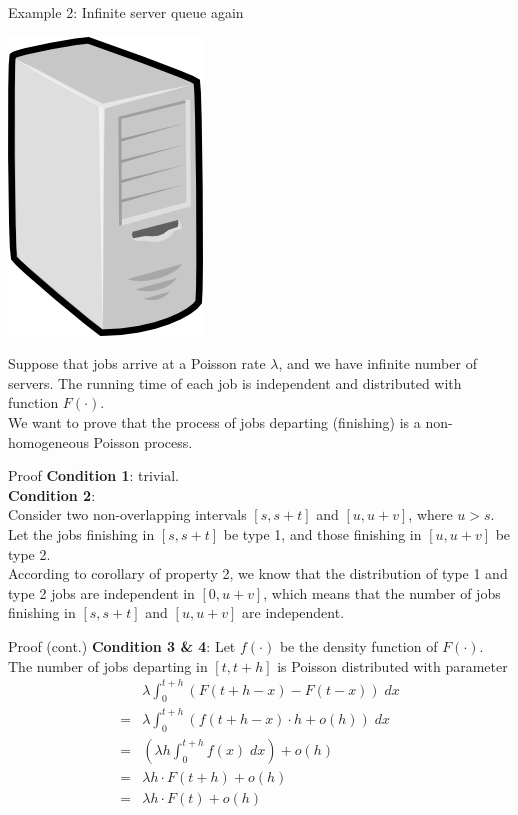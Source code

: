 \documentclass[mathserif]{beamer}
\begin{document}
\begin{frame}{Example 2: Infinite server queue again}
\begin{center}
\includegraphics[scale=0.13]{server.png}
\end{center}
Suppose that jobs arrive at a Poisson rate $\lambda$, and we have infinite number of servers.
The running time of each job is independent and distributed with function $F(\cdot)$.\\
We want to prove that the process of jobs departing (finishing) is a non-homogeneous Poisson process.
\end{frame}

\begin{frame}{Proof}
\textbf{Condition 1}: trivial.\\
\vspace{\baselineskip}
\textbf{Condition 2}:\\
Consider two non-overlapping intervals $[s,s+t]$ and $[u,u+v]$, where $u > s$.
Let the jobs finishing in $[s,s+t]$ be type 1, and those finishing in $[u,u+v]$ be type 2.\\
According to corollary of property 2, we know that the distribution of type 1 and type 2 jobs are independent in $[0,u+v]$, which means that the number of jobs finishing in $[s,s+t]$ and $[u,u+v]$ are independent.
\end{frame}

\begin{frame}{Proof (cont.)}
\textbf{Condition 3 \& 4}:
Let $f(\cdot)$ be the density function of $F(\cdot)$.
The number of jobs departing in $[t,t+h]$ is Poisson distributed with parameter
\begin{align*}
& \lambda\int_0^{t+h}(F(t+h-x)-F(t-x))\;dx \\
= & \lambda\int_0^{t+h}(f(t+h-x)\cdot h + o(h))\;dx \\
= & \left( \lambda h \int_0^{t+h} f(x)\;dx \right) + o(h) \\
= & \lambda h\cdot F(t+h) + o(h) \\
= & \lambda h\cdot F(t) + o(h)
\end{align*}
\end{frame}
\end{document}
